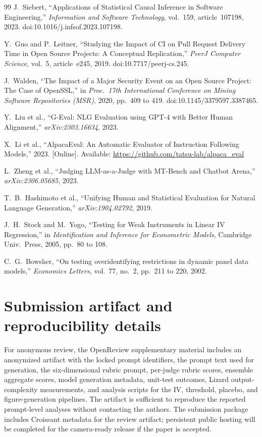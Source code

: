 \documentclass{article}
\begin{document}
\begin{thebibliography}{99}
J.~Siebert, ``Applications of Statistical Causal Inference in Software Engineering,'' \emph{Information and Software Technology}, vol.~159, article~107198, 2023. doi:10.1016/j.infsof.2023.107198.

Y.~Guo and P.~Leitner, ``Studying the Impact of CI on Pull Request Delivery Time in Open Source Projects: A Conceptual Replication,'' \emph{PeerJ Computer Science}, vol.~5, article~e245, 2019. doi:10.7717/peerj-cs.245.

J.~Walden, ``The Impact of a Major Security Event on an Open Source Project: The Case of OpenSSL,'' in \emph{Proc.\ 17th International Conference on Mining Software Repositories (MSR)}, 2020, pp.~409 to 419. doi:10.1145/3379597.3387465.

Y.~Liu et al., ``G-Eval: NLG Evaluation using GPT-4 with Better Human Alignment,'' \emph{arXiv:2303.16634}, 2023.

X.~Li et al., ``AlpacaEval: An Automatic Evaluator of Instruction Following Models,'' 2023. [Online]. Available: \url{https://github.com/tatsu-lab/alpaca_eval}

L.~Zheng et al., ``Judging LLM-as-a-Judge with MT-Bench and Chatbot Arena,'' \emph{arXiv:2306.05685}, 2023.

T.~B.~Hashimoto et al., ``Unifying Human and Statistical Evaluation for Natural Language Generation,'' \emph{arXiv:1904.02792}, 2019.

J.~H.~Stock and M.~Yogo, ``Testing for Weak Instruments in Linear IV Regression,'' in \emph{Identification and Inference for Econometric Models}, Cambridge Univ.\ Press, 2005, pp.~80 to 108.

C.~G.~Bowsher, ``On testing overidentifying restrictions in dynamic panel data models,'' \emph{Economics Letters}, vol.~77, no.~2, pp.~211 to 220, 2002.

\end{thebibliography}

\appendix
\section{Submission artifact and reproducibility details}

For anonymous review, the OpenReview supplementary material includes an anonymized artifact with the locked prompt identifiers, the prompt text used for generation, the six-dimensional rubric prompt, per-judge rubric scores, ensemble aggregate scores, model generation metadata, unit-test outcomes, Lizard output-complexity measurements, and analysis scripts for the IV, threshold, placebo, and figure-generation pipelines. The artifact is sufficient to reproduce the reported prompt-level analyses without contacting the authors. The submission package includes Croissant metadata for the review artifact; persistent public hosting will be completed for the camera-ready release if the paper is accepted.
\end{document}

